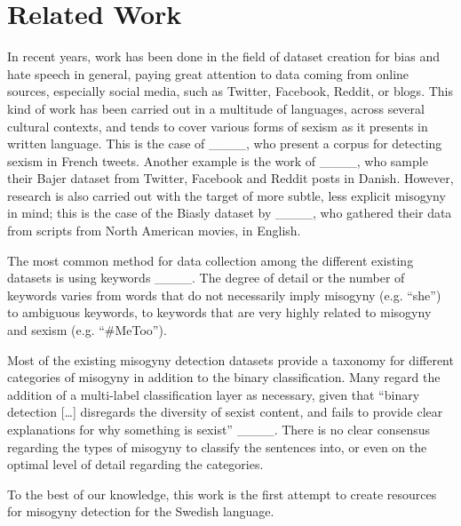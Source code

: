 \section{Related Work}
In recent years, work has been done in the field of dataset creation for bias and hate speech in general, paying great attention to data coming from online sources, especially social media, such as Twitter, Facebook, Reddit, or blogs. This kind of work has been carried out in a multitude of languages, across several cultural contexts, and tends to cover various forms of sexism as it presents in written language. This is the case of ____, who present a corpus for detecting sexism in French tweets. Another example is the work of ____, who sample their Bajer dataset from Twitter, Facebook and Reddit posts in Danish. However, research is also carried out with the target of more subtle, less explicit misogyny in mind; this is the case of the Biasly dataset by ____, who gathered their data from scripts from North American movies, in English.

The most common method for data collection among the different existing datasets is using keywords ____. The degree of detail or the number of keywords varies from words that do not necessarily imply misogyny (e.g. ``she'') to ambiguous keywords, to keywords that are very highly related to misogyny and sexism (e.g. ``\#MeToo'').

Most of the existing misogyny detection datasets provide a taxonomy for different categories of misogyny in addition to the binary classification. Many regard the addition of a multi-label classification layer as necessary, given that ``binary detection […] disregards the diversity of sexist content, and fails to provide clear explanations for why something is sexist'' ____. There is no clear consensus regarding the types of misogyny to classify the sentences into, or even on the optimal level of detail regarding the categories.

To the best of our knowledge, this work is the first attempt to create resources for misogyny detection for the Swedish language.